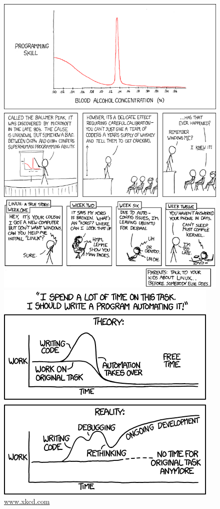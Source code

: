 \documentclass[11pt,a4paper]{book}
\begin{document}
\backmatter 
\begin{figure}
	\begin{center}
	\includegraphics[width = 0.7 \linewidth]{ballmer_peak.png}\\
	\vspace{4pt}
	\includegraphics[width = 0.7 \linewidth]{cautionary.png}\\
	\includegraphics[width = 0.7 \linewidth]{automation.png}\\
	\url{www.xkcd.com}
	\end{center}
\end{figure}

\end{document}
